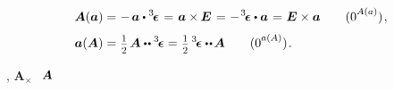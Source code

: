 \nopagebreak\vspace{-0.25em}
\begin{alignat*}{2}
\bm{A}(\bm{a}) &
= \hspace{.1ex}
- \hspace{.3ex} \bm{a} \dotp \permutationsparitytensor
\hspace{.2ex} = \hspace{.2ex}
\bm{a} \times \hspace{-0.1ex} \UnitDyad
\hspace{.2ex} = \hspace{.1ex}
- \hspace{.2ex} \permutationsparitytensor \dotp \bm{a}
\hspace{.2ex} = \hspace{.1ex}
\UnitDyad \times \bm{a}
\tag{$\theequation^{\raisemath{.15em}{A(a)}}$}\label{companionvector.bijection.pseudovector2skewsymmetricbivalent}
\hspace{.2ex} ,
\\[.3em]
%
\bm{a}(\bm{A}) &
= \hspace{.1ex}
\smalldisplaystyleonehalf \hspace{.3ex} \bm{A} \dotdotp \permutationsparitytensor
= \hspace{.1ex}
\smalldisplaystyleonehalf \hspace{.4ex} \permutationsparitytensor \dotdotp \hspace{-0.2ex} \bm{A}
\tag{$\theequation^{\raisemath{.15em}{a(A)}}$}\label{companionvector.bijection.skewsymmetricbivalent2pseudovector}
\hspace{.2ex} .
\end{alignat*}

,
${\!\bm{A}_{\!\bm{\times}}}$
~${\hspace{-0.2ex}\bm{A}}$

